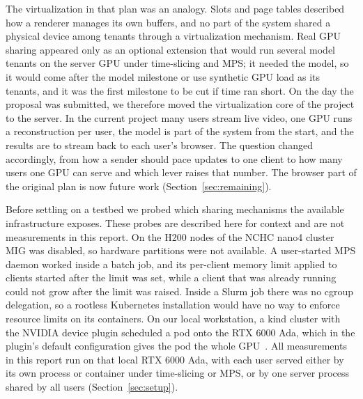 The virtualization in that plan was an analogy.
Slots and page tables described how a renderer manages its own buffers, and no part of the system shared a physical device among tenants through a virtualization mechanism.
Real GPU sharing appeared only as an optional extension that would run several model tenants on the server GPU under time-slicing and MPS; it needed the model, so it would come after the model milestone or use synthetic GPU load as its tenants, and it was the first milestone to be cut if time ran short.
On the day the proposal was submitted, we therefore moved the virtualization core of the project to the server.
In the current project many users stream live video, one GPU runs a reconstruction per user, the model is part of the system from the start, and the results are to stream back to each user's browser.
The question changed accordingly, from how a sender should pace updates to one client to how many users one GPU can serve and which lever raises that number.
The browser part of the original plan is now future work (Section~\ref{sec:remaining}).

Before settling on a testbed we probed which sharing mechanisms the available infrastructure exposes.
These probes are described here for context and are not measurements in this report.
On the H200 nodes of the NCHC nano4 cluster MIG was disabled, so hardware partitions were not available.
A user-started MPS daemon worked inside a batch job, and its per-client memory limit applied to clients started after the limit was set, while a client that was already running could not grow after the limit was raised.
Inside a Slurm job there was no cgroup delegation, so a rootless Kubernetes installation would have no way to enforce resource limits on its containers.
On our local workstation, a kind cluster with the NVIDIA device plugin scheduled a pod onto the RTX 6000 Ada, which in the plugin's default configuration gives the pod the whole GPU~\cite{k8s_device_plugin}.
All measurements in this report run on that local RTX 6000 Ada, with each user served either by its own process or container under time-slicing or MPS, or by one server process shared by all users (Section~\ref{sec:setup}).
